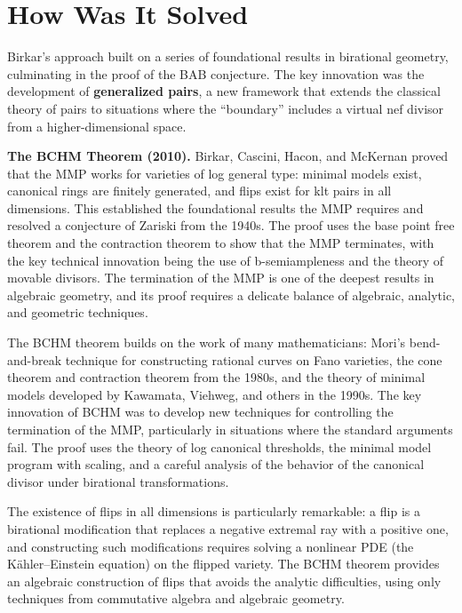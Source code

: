\section{How Was It Solved}

Birkar's approach \cite{birkar2018} built on a series of foundational results in birational geometry, culminating in the proof of the BAB conjecture. The key innovation was the development of \textbf{generalized pairs}, a new framework that extends the classical theory of pairs to situations where the ``boundary'' includes a virtual nef divisor from a higher-dimensional space.

\textbf{The BCHM Theorem (2010).} Birkar, Cascini, Hacon, and McKernan proved that the MMP works for varieties of log general type: minimal models exist, canonical rings are finitely generated, and flips exist for klt pairs in all dimensions. This established the foundational results the MMP requires and resolved a conjecture of Zariski from the 1940s. The proof uses the base point free theorem and the contraction theorem to show that the MMP terminates, with the key technical innovation being the use of b-semiampleness and the theory of movable divisors. The termination of the MMP is one of the deepest results in algebraic geometry, and its proof requires a delicate balance of algebraic, analytic, and geometric techniques.

The BCHM theorem builds on the work of many mathematicians: Mori's bend-and-break technique for constructing rational curves on Fano varieties, the cone theorem and contraction theorem from the 1980s, and the theory of minimal models developed by Kawamata, Viehweg, and others in the 1990s. The key innovation of BCHM was to develop new techniques for controlling the termination of the MMP, particularly in situations where the standard arguments fail. The proof uses the theory of log canonical thresholds, the minimal model program with scaling, and a careful analysis of the behavior of the canonical divisor under birational transformations.

The existence of flips in all dimensions is particularly remarkable: a flip is a birational modification that replaces a negative extremal ray with a positive one, and constructing such modifications requires solving a nonlinear PDE (the K\"ahler--Einstein equation) on the flipped variety. The BCHM theorem provides an algebraic construction of flips that avoids the analytic difficulties, using only techniques from commutative algebra and algebraic geometry.

